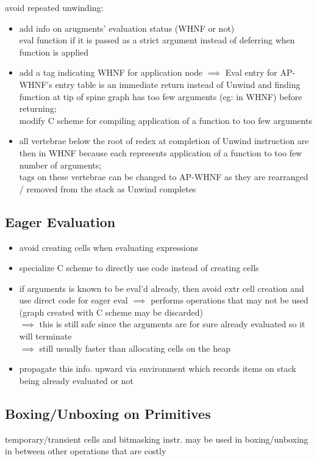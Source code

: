\documentclass[8pt]{extarticle}
\begin{document}
\begin{multicols*}{2}
avoid repeated unwinding:
\begin{itemize}
\item add info on arugments' evaluation status (WHNF or not)\\
  eval function if it is passed as a strict argument instead of deferring when function is applied
\item add a tag indicating WHNF for application node $\implies$ Eval entry for AP-WHNF's entry table is an immediate return instead of Unwind and finding function at tip of spine graph has too few arguments (eg: in WHNF) before returning;\\
  modify C scheme for compiling application of a function to too few arguments
\item all vertebrae below the root of redex at completion of Unwind instruction are then in WHNF because each represents application of a function to too few number of arguments;\\
  tags on these vertebrae can be changed to AP-WHNF as they are rearranged / removed from the stack as Unwind completes
\end{itemize}

\subsection{Eager Evaluation}
\begin{itemize}
\item avoid creating cells when evaluating expressions
\item specialize C scheme to directly use code instead of creating cells
\item if arguments is known to be eval'd already, then avoid extr cell creation and use direct code for eager eval $\implies$ performs operations that may not be used (graph created with C scheme may be discarded)\\
  $\implies$ this is still safe since the arguments are for sure already evaluated so it will terminate\\
  $\implies$ still usually faster than allocating cells on the heap
\item propagate this info. upward via environment which records items on stack being already evaluated or not
\end{itemize}

\subsection{Boxing/Unboxing on Primitives}
temporary/transient cells and bitmasking instr. may be used in boxing/unboxing in between other operations that are costly


\end{multicols*}
\end{document}
